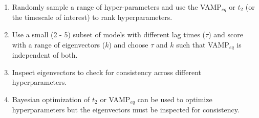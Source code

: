 \documentclass[journal=jacsat,manuscript=article]{achemso}
\begin{document}
\begin{enumerate}
    \item Randomly sample a range of hyper-parameters and use the VAMP$_{eq}$ or $t_2$ (or the timescale of interest) to rank hyperparameters. 
    \item Use a small (2 - 5) subset of models with different lag times ($\tau$) and score with a range of eigenvectors ($k$) and choose $\tau$ and $k$ such that VAMP$_{eq}$ is independent of both.  
    \item Inspect eigenvectors to check for consistency across different hyperparameters. 
    \item Bayesian optimization of $t_2$ or VAMP$_{eq}$ can be used to optimize hyperparameters but the eigenvectors must be inspected for consistency.  
\end{enumerate}




\end{document}
